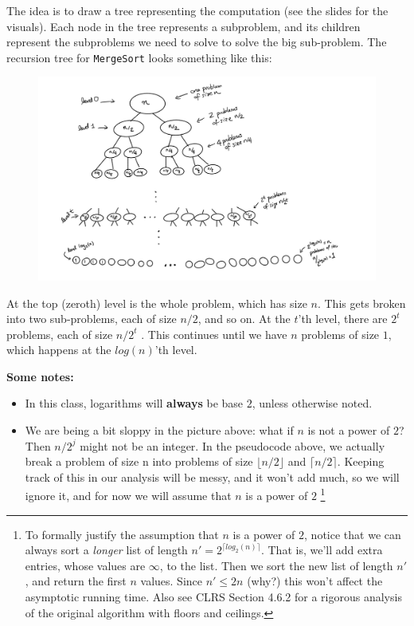 \documentclass [12pt]{article}
\begin{document}
The idea is to draw a tree representing the computation (see the slides for the visuals). Each node in the tree represents a subproblem, and its children represent the subproblems we need to solve to solve the big sub-problem. The recursion tree for \texttt{MergeSort} looks something like
this:

\begin{figure}[h!]
\centering{}
\includegraphics[scale=0.75]{mergesort_tree.png}
\end{figure}

At the top (zeroth) level is the whole problem, which has size $n$. This gets broken into two sub-problems, each of size $n/2$, and so on. At the $t$'th level, there are $2^t$ problems, each of size $n/2^t$
. This continues until we have $n$ problems of size $1$, which happens at the $log(n)$'th level.

\textbf{Some notes:}

\begin{itemize}
\item In this class, logarithms will \textbf{always} be base $2$, unless otherwise noted.
\item We are being a bit sloppy in the picture above: what if $n$ is not a power of $2$? Then $n/2^j$ might not be an integer. In the pseudocode above, we actually break a problem of size n into problems of size $\lfloor n/2 \rfloor$ and $\lceil n/2 \rceil$. Keeping track of this in our analysis will be messy, and it won't add much, so we will ignore it, and for now we will assume that $n$ is a power of $2$ \footnote{To formally justify the assumption that $n$ is a power of $2$, notice that we can always sort a \textit{longer} list of length $n' = 2^{\lceil log_2(n) \rceil}$. That is, we'll add extra entries, whose values are $\infty$, to the list. Then we sort the new list of length $n'$, and return the first $n$ values. Since $n' \leq 2n$ (why?) this won't affect the asymptotic running time. Also see CLRS Section 4.6.2 for a rigorous analysis of the original algorithm with floors and ceilings.}
\end{itemize}
\end{document}
